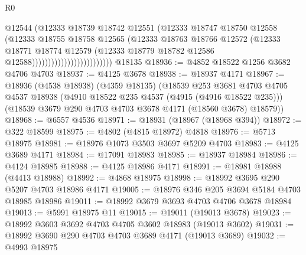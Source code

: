 \begin{lexlean}{R0}
\begin{coremodule}
                                          @12544
                                          (@12333
                                            @18739
                                            @18742
                                            @12551
                                            (@12333
                                              @18747
                                              @18750
                                              @12558
                                              (@12333
                                                @18755
                                                @18758
                                                @12565
                                                (@12333
                                                  @18763
                                                  @18766
                                                  @12572
                                                  (@12333
                                                    @18771
                                                    @18774
                                                    @12579
                                                    (@12333
                                                      @18779
                                                      @18782
                                                      @12586
                                                      @12588)))))))))))))))))))))))))
    @18135
@18936 := @4852 @18522 @1256 @3682 @4706 @4703
@18937 := @4125 @3678
@18938 := @18937 @4171
@18967 := @18936
    (@4538 @18938)
    (@4359 @18135)
    (@18539
      @253
      @3681
      @4703
      @4705
      @4537
      @18938
      (@4910 @18522 @235 @4537 (@4915 (@4916 @18522 @235)))
      (@18539 @3679 @290 @4703 @4703 @3678 @4171 (@18560 @3678) @18579))
@18968 := @6557 @4536
@18971 := @18931 (@18967 (@18968 @394))
@18972 := @322 @18599
@18975 := @4802 (@4815 @18972) @4818
@18976 := @5713 @18975
@18981 := @18976 @1073 @3503 @3697 @5209 @4703
@18983 := @4125 @3689 @4171
@18984 := @17091 @18983
@18985 := @18937 @18984
@18986 := @4124 @18985
@18988 := @4125 @18986 @4171
@18991 := @18981 @18988 (@4413 @18988)
@18992 := @4868 @18975
@18998 := @18992 @3695 @290 @5207 @4703 @18986 @4171
@19005 := @18976 @346 @205 @3694 @5184 @4703 @18985 @18986
@19011 := @18992 @3679 @3693 @4703 @4706 @3678 @18984
@19013 := @5991 @18975 @11
@19015 := @19011 (@19013 @3678)
@19023 := @18992 @3603 @3692 @4703 @4705 @3602 @18983 (@19013 @3602)
@19031 := @18992 @3690 @290 @4703 @4703 @3689 @4171 (@19013 @3689)
@19032 := @4993 @18975

\end{coremodule}
\end{lexlean}
